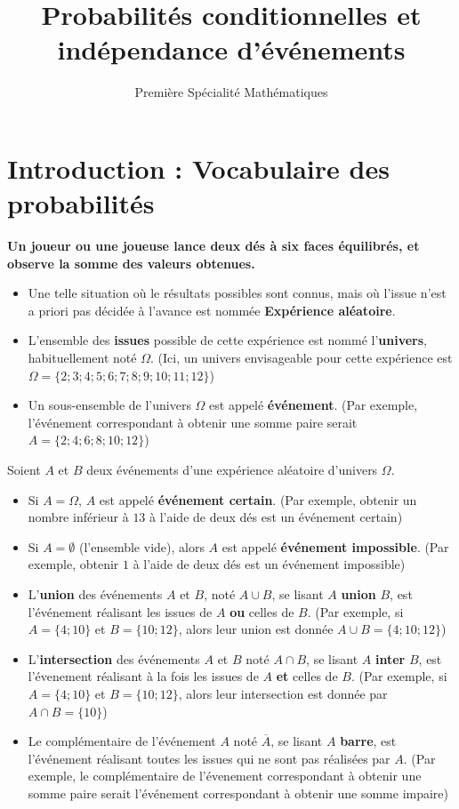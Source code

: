\documentclass{article}
\title{Probabilités conditionnelles et indépendance d'événements}
\date{}
\author{Première Spécialité Mathématiques}
\begin{document}
\maketitle

\section{Introduction : Vocabulaire des probabilités}
\begin{tcolorbox}
\textbf{Un joueur ou une joueuse lance deux dés à six faces équilibrés, et observe la somme des valeurs obtenues.}
\end{tcolorbox}
\begin{definition}
\hfill
\begin{itemize}
\item Une telle situation où le résultats possibles sont connus, mais où l'issue n'est a priori pas décidée à l'avance est nommée \textbf{Expérience aléatoire}.
\item L'ensemble des \textbf{issues} possible de cette expérience est nommé l'\textbf{univers}, habituellement noté $\Omega$. (Ici, un univers envisageable pour cette expérience est $\Omega = \{2;3;4;5;6;7;8;9;10;11;12\}$)
\item Un sous-ensemble de l'univers $\Omega$ est appelé \textbf{événement}. (Par exemple, l'événement correspondant à obtenir une somme paire serait $A = \{2;4;6;8;10;12\}$)
\end{itemize}
\end{definition}
\begin{definition}
Soient $A$ et $B$ deux événements d'une expérience aléatoire d'univers $\Omega$.
\begin{itemize}
\item Si $A = \Omega$, $A$ est appelé \textbf{événement certain}. (Par exemple, obtenir un nombre inférieur à $13$ à l'aide de deux dés est un événement certain)
\item Si $A = \emptyset$ (l'ensemble vide), alors $A$ est appelé \textbf{événement impossible}. (Par exemple, obtenir $1$ à l'aide de deux dés est un événement impossible)
\item L'\textbf{union} des événements $A$ et $B$, noté $A \cup B$, se lisant \og $A$ \textbf{union} $B$\fg, est l'événement réalisant les issues de $A$ \textbf{ou} celles de $B$. (Par exemple, si $A = \{4;10\}$ et $B = \{10;12\}$, alors leur union est donnée $A \cup B = \{4;10;12\}$)
\item L'\textbf{intersection} des événements $A$ et $B$ noté $A \cap B$, se lisant \og $A$ \textbf{inter} $B$, est l'évenement réalisant à la fois les issues de $A$ \textbf{et} celles de $B$. (Par exemple, si $A = \{4;10\}$ et $B = \{10;12\}$, alors leur intersection est donnée par $A \cap B = \{10\}$)
\item Le complémentaire de l'événement $A$ noté $\overbar{A}$, se lisant \og $A$ \textbf{barre}\fg, est l'événement réalisant toutes les issues qui ne sont pas réalisées par $A$. (Par exemple, le complémentaire de l'évenement correspondant à obtenir une somme paire serait l'événement correspondant à obtenir une somme impaire)
\end{itemize}
\end{definition}
\end{document}
